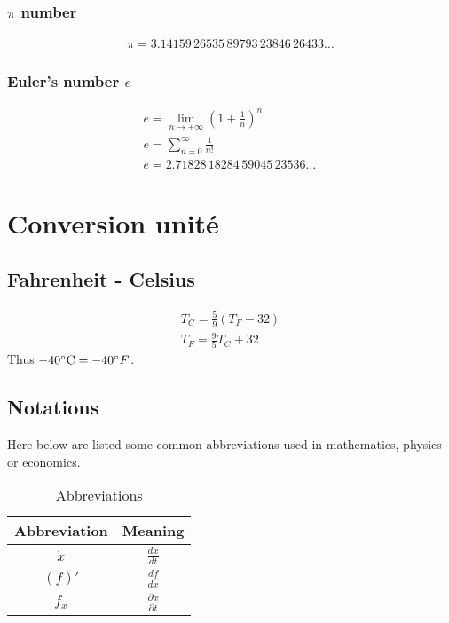 \subsection{$\pi$ number}
\begin{eqnarray}
	\pi = 3.14159\,26535\,89793\,23846\,26433\ldots
\end{eqnarray}
\subsection{Euler's number $e$}
\begin{eqnarray}
	e=\lim_{n\rightarrow+\infty}\left(1+\frac{1}{n}\right)^n\\
	e=\sum_{n=0}^{\infty}\frac{1}{n!}\\
	e=2.71828\,18284\,59045\,23536\ldots\,
\end{eqnarray}




\chapter{Conversion unité}
\section{Fahrenheit - Celsius}
\begin{eqnarray}
	T_C=\frac{5}{9}(T_F-32)\\
	T_F=\frac{9}{5}T_C+32
\end{eqnarray}
Thus $-40\celsius=-40\degree F$.

\section{Notations}
Here below are listed some common abbreviations used in mathematics, physics or economics.


\begin{table}[h!]
	\centering
	\begin{tabular}{|c|c|}
		\hline 
		\textbf{Abbreviation}&\textbf{Meaning}\\
		\hline
	    \hline
		$\dot x$ &  $\frac{dx}{dt}$\\ 
		\hline
		$(f)'$ &  $\frac{df}{dx}$\\ 
		\hline
		$f_x$ &  $\frac{\partial x}{\partial t}$\\ 
		\hline
	 \end{tabular}	
	\caption{Abbreviations}
	\label{table:abbreviations}
\end{table}

